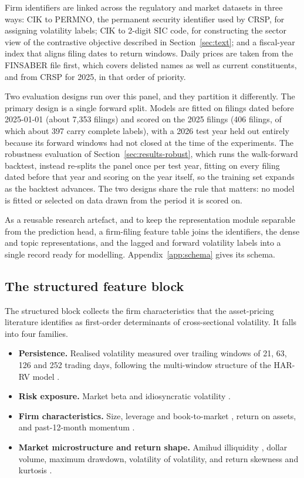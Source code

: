 \documentclass[logo,msc,ai]{infthesis}        %
\begin{document}
Firm identifiers are linked across the regulatory and market datasets in three ways: CIK to PERMNO, the permanent security identifier used by CRSP, for assigning volatility labels; CIK to 2-digit SIC code, for constructing the sector view of the contrastive objective described in Section~\ref{sec:text}; and a fiscal-year index that aligns filing dates to return windows. Daily prices are taken from the FINSABER file first, which covers delisted names as well as current constituents, and from CRSP for 2025, in that order of priority.

Two evaluation designs run over this panel, and they partition it differently. The primary design is a single forward split. Models are fitted on filings dated before 2025-01-01 (about 7{,}353 filings) and scored on the 2025 filings (406 filings, of which about 397 carry complete labels), with a 2026 test year held out entirely because its forward windows had not closed at the time of the experiments. The robustness evaluation of Section~\ref{sec:results-robust}, which runs the walk-forward backtest, instead re-splits the panel once per test year, fitting on every filing dated before that year and scoring on the year itself, so the training set expands as the backtest advances. The two designs share the rule that matters: no model is fitted or selected on data drawn from the period it is scored on.

As a reusable research artefact, and to keep the representation module separable from the prediction head, a firm-filing feature table joins the identifiers, the dense and topic representations, and the lagged and forward volatility labels into a single record ready for modelling. Appendix~\ref{app:schema} gives its schema.

\subsection{The structured feature block}
\label{sec:struct}
The structured block collects the firm characteristics that the asset-pricing literature identifies as first-order determinants of cross-sectional volatility. It falls into four families.

\begin{itemize}
\item \textbf{Persistence.} Realised volatility measured over trailing windows of 21, 63, 126 and 252 trading days, following the multi-window structure of the HAR-RV model \cite{corsi2009simple}.
\item \textbf{Risk exposure.} Market beta and idiosyncratic volatility \cite{ang2006cross}.
\item \textbf{Firm characteristics.} Size, leverage and book-to-market \cite{ang2006cross,fama1992cross}, return on assets, and past-12-month momentum \cite{ang2006cross}.
\item \textbf{Market microstructure and return shape.} Amihud illiquidity \cite{amihud2002illiquidity}, dollar volume, maximum drawdown, volatility of volatility, and return skewness and kurtosis \cite{conrad2013ex}.
\end{itemize}
\end{document}
